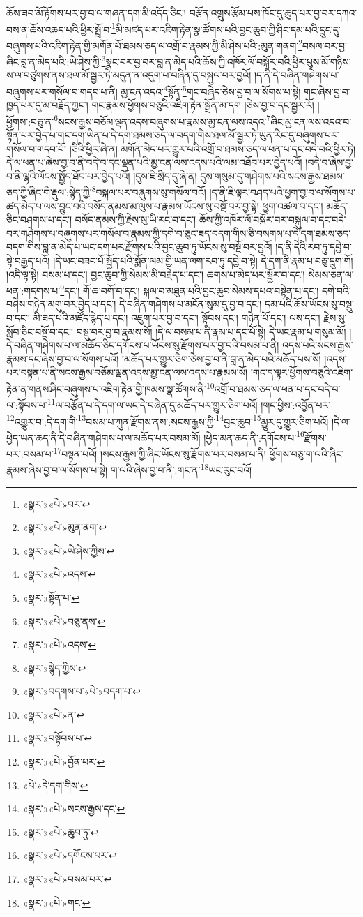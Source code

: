 ཆོས་ཟབ་མོ་རྟོགས་པར་བྱ་བ་ལ་གཞན་དག་མི་འདོད་ཅིང་། བརྩོན་འགྲུས་རྩོམ་པས་ཁོང་དུ་ཆུད་པར་བྱ་བར་དཀའ་བས་ན་ཆོས་འཆད་པའི་ཕྱིར་སྤྲོ་བ་\footnote{«སྣར་»«པེ་»བར་}མི་མཛད་པར་འཇིག་རྟེན་སྣ་ཚོགས་པའི་བྱང་ཆུབ་ཀྱི་ཤིང་དམ་པའི་དྲུང་དུ་བཞུགས་པའི་འཇིག་རྟེན་གྱི་མགོན་པོ་ཐམས་ཅད་ལ་འགྲོ་བ་རྣམས་ཀྱི་མི་ཤེས་པའི་:མུན་གནག་\footnote{«སྣར་»«པེ་»མུན་ནག་}བསལ་བར་བྱ་ཞིང་བླ་ན་མེད་པའི་:ཡེ་ཤེས་ཀྱི་\footnote{«སྣར་»«པེ་»ཡེ་ཤེས་ཀྱིས་}སྣང་བར་བྱ་བར་བླ་ན་མེད་པའི་ཆོས་ཀྱི་འཁོར་ལོ་བསྐོར་བའི་ཕྱིར་པུས་མོ་གཉིས་ས་ལ་བཙུགས་ནས་ཐལ་མོ་སྦྱར་ཏེ་མདུན་ན་འདུག་པ་བཞིན་དུ་བསྐུལ་བར་བྱའོ། །ད་ནི་དེ་བཞིན་གཤེགས་པ་བཞུགས་པར་གསོལ་བ་གདབ་པ་ནི། མྱ་ངན་འདའ་\footnote{«སྣར་»«པེ་»འདས་}སྟོན་\footnote{«སྣར་»སྟོན་པ་}གང་བཞེད་ཅེས་བྱ་བ་ལ་སོགས་པ་སྟེ། གང་ཞེས་བྱ་བ་ཁྱད་པར་དུ་མ་བརྗོད་ཀྱང་། གང་རྣམས་ཕྱོགས་བཅུའི་འཇིག་རྟེན་སྒྲོན་མ་དག །ཅེས་བྱ་བ་དང་སྦྱར་རོ། །ཕྱོགས་:བཅུ་ན་\footnote{«སྣར་»«པེ་»བཅུ་ནས་}སངས་རྒྱས་བཅོམ་ལྡན་འདས་བཞུགས་པ་རྣམས་མྱ་ངན་ལས་འདའ་\footnote{«སྣར་»«པེ་»འདས་}ཞིང་མྱ་ངན་ལས་འདའ་བ་སྟོན་པར་བྱེད་པ་གང་དག་ཡིན་པ་དེ་དག་ཐམས་ཅད་ལ་བདག་གིས་ཐལ་མོ་སྦྱར་ཏེ་ཡུན་རིང་དུ་བཞུགས་པར་གསོལ་བ་གདབ་པོ། །ཅིའི་ཕྱིར་ཞེ་ན། མགོན་མེད་པར་གྱུར་པའི་འགྲོ་བ་ཐམས་ཅད་ལ་ཕན་པ་དང་བདེ་བའི་ཕྱིར་ཏེ། དེ་ལ་ཕན་པ་ཞེས་བྱ་བ་ནི་བདེ་བ་དང་ལྡན་པའི་མྱ་ངན་ལས་འདས་པའི་ལམ་འཐོབ་པར་བྱེད་པའོ། །བདེ་བ་ཞེས་བྱ་བ་ནི་ལྷའི་ལོངས་སྤྱོད་ཐོབ་པར་བྱེད་པའོ། །དུས་ཇི་སྲིད་དུ་ཞེ་ན། དུས་གསུམ་དུ་གཤེགས་པའི་སངས་རྒྱས་ཐམས་ཅད་ཀྱི་ཞིང་གི་རྡུལ་:སྙེད་ཀྱི་\footnote{«སྣར་»སྙེད་ཀྱིས་}བསྐལ་པར་བཞུགས་སུ་གསོལ་བའོ། །ད་ནི་ཇི་ལྟར་བཤད་པའི་ཕྱག་བྱ་བ་ལ་སོགས་པ་ཚད་མེད་པ་ལས་བྱུང་བའི་བསོད་ནམས་མ་ལུས་པ་རྣམས་ཡོངས་སུ་བསྔོ་བར་བྱ་སྟེ། ཕྱག་འཚལ་བ་དང་། མཆོད་ཅིང་བཤགས་པ་དང་། བསོད་ནམས་ཀྱི་རྗེས་སུ་ཡི་རང་བ་དང་། ཆོས་ཀྱི་འཁོར་ལོ་བསྐོར་བར་བསྐུལ་བ་དང་བདེ་བར་གཤེགས་པ་བཞུགས་པར་གསོལ་བ་རྣམས་ཀྱི་དགེ་བ་ཅུང་ཟད་བདག་གིས་ཅི་བསགས་པ་དེ་དག་ཐམས་ཅད་བདག་གིས་བླ་ན་མེད་པ་ཡང་དག་པར་རྫོགས་པའི་བྱང་ཆུབ་ཏུ་ཡོངས་སུ་བསྔོ་བར་བྱའོ། །ད་ནི་དེའི་རབ་ཏུ་དབྱེ་བ་སྟེ་བརྒྱད་པའོ། །དེ་ཡང་བཟང་པོ་སྤྱོད་པའི་སྨོན་ལམ་གྱི་ཡན་ལག་རབ་ཏུ་དབྱེ་བ་སྟེ། དེ་དག་ནི་རྣམ་པ་བཅུ་དྲུག་གོ། །འདི་ལྟ་སྟེ། བསམ་པ་དང་། བྱང་ཆུབ་ཀྱི་སེམས་མི་བརྗེད་པ་དང་། ཆགས་པ་མེད་པར་སྦྱོར་བ་དང་། སེམས་ཅན་ལ་ཕན་:གདགས་པ་\footnote{«སྣར་»བདགས་པ་«པེ་»བདག་པ་}དང་། གོ་ཆ་བགོ་བ་དང་། སྐལ་བ་མཐུན་པའི་བྱང་ཆུབ་སེམས་དཔའ་བསྟེན་པ་དང་། དགེ་བའི་བཤེས་གཉེན་མགུ་བར་བྱེད་པ་དང་། དེ་བཞིན་གཤེགས་པ་མངོན་སུམ་དུ་བྱ་བ་དང་། དམ་པའི་ཆོས་ཡོངས་སུ་བསྡུ་བ་དང་། མི་ཟད་པའི་མཛོད་རྙེད་པ་དང་། འཇུག་པར་བྱ་བ་དང་། སྟོབས་དང་། གཉེན་པོ་དང་། ལས་དང་། རྗེས་སུ་སློབ་ཅིང་བསྔོ་བ་དང་། བསྡུ་བར་བྱ་བ་རྣམས་སོ། །དེ་ལ་བསམ་པ་ནི་རྣམ་པ་དང་པོ་སྟེ། དེ་ཡང་རྣམ་པ་གསུམ་མོ། །དེ་བཞིན་གཤེགས་པ་ལ་མཆོད་ཅིང་དགོངས་པ་ཡོངས་སུ་རྫོགས་པར་བྱ་བའི་བསམ་པ་ནི། འདས་པའི་སངས་རྒྱས་རྣམས་དང་ཞེས་བྱ་བ་ལ་སོགས་པའོ། །མཆོད་པར་གྱུར་ཅིག་ཅེས་བྱ་བ་ནི་བླ་ན་མེད་པའི་མཆོད་པས་སོ། །འདས་པར་བསྟན་པ་ནི་སངས་རྒྱས་བཅོམ་ལྡན་འདས་མྱ་ངན་ལས་འདས་པ་རྣམས་སོ། །གང་ད་ལྟར་ཕྱོགས་བཅུའི་འཇིག་རྟེན་ན་གནས་ཤིང་བཞུགས་པ་འཇིག་རྟེན་གྱི་ཁམས་སྣ་ཚོགས་ནི་\footnote{«སྣར་»«པེ་»ན་}འགྲོ་བ་ཐམས་ཅད་ལ་ཕན་པ་དང་བདེ་བ་ལ་:སྟོབས་པ་\footnote{«སྣར་»བསྟོབས་པ་}ལ་བརྩོན་པ་དེ་དག་ལ་ཡང་དེ་བཞིན་དུ་མཆོད་པར་གྱུར་ཅིག་པའོ། །གང་ཕྱིས་:འབྱོན་པར་\footnote{«སྣར་»«པེ་»བྱོན་པར་}འགྱུར་བ་:དེ་དག་གི་\footnote{«པེ་»དེ་དག་གིས་}བསམ་པ་ཀུན་རྫོགས་ནས་:སངས་རྒྱས་ཀྱི་\footnote{«སྣར་»«པེ་»སངས་རྒྱས་དང་}བྱང་ཆུབ་\footnote{«སྣར་»«པེ་»ཆུབ་ཏུ་}མྱུར་དུ་གྱུར་ཅིག་པའོ། །དེ་ལ་ཕྱེད་ཡན་ཆད་ནི་དེ་བཞིན་གཤེགས་པ་ལ་མཆོད་པར་བསམ་མོ། །ཕྱེད་མན་ཆད་ནི་:དགོངས་པ་\footnote{«སྣར་»«པེ་»དགོངས་པར་}རྫོགས་པར་:བསམ་པ་\footnote{«སྣར་»«པེ་»བསམ་པར་}བསྟན་པའོ། །སངས་རྒྱས་ཀྱི་ཞིང་ཡོངས་སུ་རྫོགས་པར་བསམ་པ་ནི། ཕྱོགས་བཅུ་ག་ལའི་ཞིང་རྣམས་ཞེས་བྱ་བ་ལ་སོགས་པ་སྟེ། ག་ལའི་ཞེས་བྱ་བ་ནི་:གང་ན་\footnote{«སྣར་»«པེ་»གང་}ཡང་རུང་བའོ། 